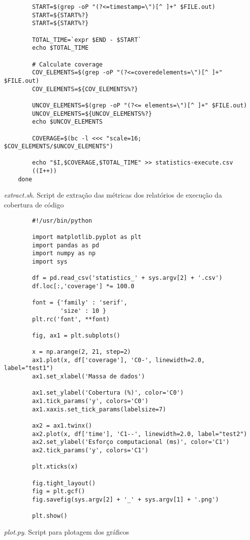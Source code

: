 \begin{apendicesenv}
\begin{listing}
\begin{verbatim}
        START=$(grep -oP "(?<=timestamp=\")[^ ]+" $FILE.out)
        START=${START%?}
        START=${START%?}

        TOTAL_TIME=`expr $END - $START`
        echo $TOTAL_TIME

        # Calculate coverage
        COV_ELEMENTS=$(grep -oP "(?<=coveredelements=\")[^ ]+" $FILE.out)
        COV_ELEMENTS=${COV_ELEMENTS%?}

        UNCOV_ELEMENTS=$(grep -oP "(?<= elements=\")[^ ]+" $FILE.out)
        UNCOV_ELEMENTS=${UNCOV_ELEMENTS%?}
        echo $UNCOV_ELEMENTS

        COVERAGE=$(bc -l <<< "scale=16; $COV_ELEMENTS/$UNCOV_ELEMENTS")

        echo "$I,$COVERAGE,$TOTAL_TIME" >> statistics-execute.csv
        ((I++))
    done
    \end{verbatim}
    \caption{\textit{extract.sh}. Script de extração das métricas dos relatórios de execução da cobertura de código}  
    \label{extract.sh}
\end{listing}


\begin{listing}
    \begin{verbatim}
        #!/usr/bin/python

        import matplotlib.pyplot as plt
        import pandas as pd
        import numpy as np
        import sys

        df = pd.read_csv('statistics_' + sys.argv[2] + '.csv')
        df.loc[:,'coverage'] *= 100.0

        font = {'family' : 'serif',
                'size' : 10 }
        plt.rc('font', **font)

        fig, ax1 = plt.subplots()

        x = np.arange(2, 21, step=2)
        ax1.plot(x, df['coverage'], 'C0-', linewidth=2.0, label="test1")
        ax1.set_xlabel('Massa de dados')

        ax1.set_ylabel('Cobertura (%)', color='C0')
        ax1.tick_params('y', colors='C0')
        ax1.xaxis.set_tick_params(labelsize=7)

        ax2 = ax1.twinx()
        ax2.plot(x, df['time'], 'C1--', linewidth=2.0, label="test2")
        ax2.set_ylabel('Esforço computacional (ms)', color='C1')
        ax2.tick_params('y', colors='C1')

        plt.xticks(x)

        fig.tight_layout()
        fig = plt.gcf()
        fig.savefig(sys.argv[2] + '_' + sys.argv[1] + '.png')

        plt.show()
        \end{verbatim}
        \caption{\textit{plot.py}. Script para plotagem dos gráficos}  
        \label{plot.py}
\end{listing}


\end{apendicesenv}
